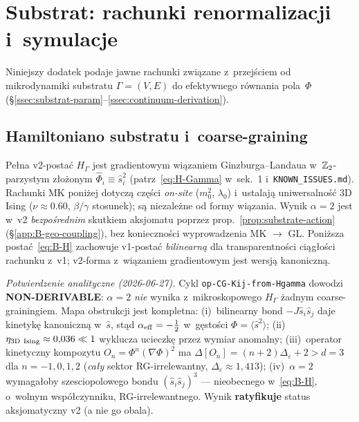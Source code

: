 \section{Substrat: rachunki renormalizacji i~symulacje}%
\label{app:substrat}

Niniejszy dodatek podaje jawne rachunki zwi\k{a}zane z~przej\'sciem
od mikrodynamiki substratu $\Gamma = (V, E)$ do efektywnego
r\'ownania pola~$\Phi$ (\S\ref{ssec:substrat-param}--\ref{ssec:continuum-derivation}).

\subsection{Hamiltoniano substratu i~coarse-graining}%
\label{app:B-hamiltoniano}

\begin{remark}
\label{rem:B-v2-status}
Pe\l{}na v2-posta\'c $H_\Gamma$ jest gradientowym wi\k{a}zaniem
Ginzburga--Landaua w~$\mathbb{Z}_2$-parzystym z\l{}o\.zonym
$\hat{\Phi}_i \equiv \hat{s}_i^2$ (patrz~\eqref{eq:H-Gamma} w~sek.~1
i~\texttt{KNOWN\_ISSUES.md}). Rachunki MK poni\.zej dotycz\k{a}
cz\k{e}\'sci \emph{on-site} ($m_0^2$, $\lambda_0$) i~ustalaj\k{a}
uniwersalno\'s\'c 3D Ising ($\nu \approx 0.60$, $\beta/\gamma$
stosunek); s\k{a} niezale\.zne od formy wi\k{a}zania. Wynik
$\alpha = 2$ jest w~v2 \emph{bezpo\'srednim} skutkiem aksjomatu
poprzez prop.~\ref{prop:substrate-action} (§\ref{app:B-geo-coupling}),
bez konieczno\'sci wyprowadzenia MK $\to$ GL. Poni\.zsza
posta\'c~\eqref{eq:B-H} zachowuje v1-posta\'c \emph{bilinearn\k{a}}
dla transparentno\'sci ci\k{a}g\l{}o\'sci rachunku z~v1; v2-forma
z~wi\k{a}zaniem gradientowym jest wersj\k{a} kanoniczn\k{a}.

\emph{Potwierdzenie analityczne (2026-06-27).} Cykl
\texttt{op-CG-Kij-from-Hgamma} dowodzi \textbf{NON-DERIVABLE}: $\alpha = 2$
\emph{nie} wynika z~mikroskopowego $H_\Gamma$ \.zadnym coarse-grainingiem.
Mapa obstrukcji jest kompletna: (i)~bilinearny bond $-J\hat s_i\hat s_j$ daje
kinetyk\k{e} kanoniczn\k{a} w~$\hat s$, st\k{a}d $\alpha_{\rm eff} = -\tfrac12$
w~g\k{e}sto\'sci $\Phi = \langle\hat s^2\rangle$; (ii)~$\eta_{\rm 3D~Ising}
\approx 0{,}036 \ll 1$ wyklucza ucieczk\k{e} przez wymiar anomalny;
(iii)~operator kinetyczny kompozytu $O_n = \Phi^n(\nabla\Phi)^2$ ma
$\Delta[O_n] = (n{+}2)\Delta_\varepsilon + 2 > d = 3$ dla $n = -1,0,1,2$
(\emph{ca\l{}y} sektor RG-irrelewantny, $\Delta_\varepsilon \approx 1{,}413$);
(iv)~$\alpha = 2$ wymaga\l{}oby szesciopolowego bondu $(\hat s_i\hat s_j)^3$
--- nieobecnego w~\eqref{eq:B-H}, o~wolnym wsp\'o\l{}czynniku, RG-irrelewantnego.
Wynik \textbf{ratyfikuje} status aksjomatyczny v2 (a nie go obala).
\end{remark}

